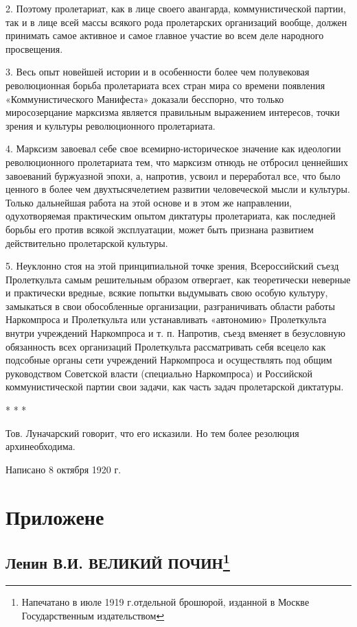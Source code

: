 \documentclass[12pt]{article}
\newcommand\resetparcount{%
  \setcounter{parcount}{0}
}
\newcounter{parcount}
\begin{document}
2. Поэтому пролетариат, как в лице своего авангарда, коммунистической партии, так и в лице всей массы всякого рода пролетарских организаций вообще, должен принимать самое активное и самое главное участие во всем деле народного просвещения.

3. Весь опыт новейшей истории и в особенности более чем полувековая революционная борьба пролетариата всех стран мира со времени появления «Коммунистического Манифеста» доказали бесспорно, что только миросозерцание марксизма является правильным выражением интересов, точки зрения и культуры революционного пролетариата.

4. Марксизм завоевал себе свое всемирно-историческое значение как идеологии революционного пролетариата тем, что марксизм отнюдь не отбросил ценнейших завоеваний буржуазной эпохи, а, напротив, усвоил и переработал все, что было ценного в более чем двухтысячелетием развитии человеческой мысли и культуры. Только дальнейшая работа на этой основе и в этом же направлении, одухотворяемая практическим опытом диктатуры пролетариата, как последней борьбы его против всякой эксплуатации, может быть признана развитием действительно пролетарской культуры.

5. Неуклонно стоя на этой принципиальной точке зрения, Всероссийский съезд Пролеткульта самым решительным образом отвергает, как теоретически неверные и практически вредные, всякие попытки выдумывать свою особую культуру, замыкаться в свои обособленные организации, разграничивать области работы Наркомпроса и Пролеткульта или устанавливать «автономию» Пролеткульта внутри учреждений Наркомпроса и т. п. Напротив, съезд вменяет в безусловную обязанность всех организаций Пролеткульта рассматривать себя всецело как подсобные органы сети учреждений Наркомпроса и осуществлять под общим руководством Советской власти (специально Наркомпроса) и Российской коммунистической партии свои задачи, как часть задач пролетарской диктатуры.

* * *

Тов. Луначарский говорит, что его исказили. Но тем более резолюция архинеобходима.

Написано 8 октября 1920 г.

\section{Приложене}
\resetparcount
\subsection{Ленин В.И. ВЕЛИКИЙ ПОЧИН\footnote{Напечатано в июле 1919 г.отдельной брошюрой, изданной в Москве Государственным издательством}}
\end{document}
